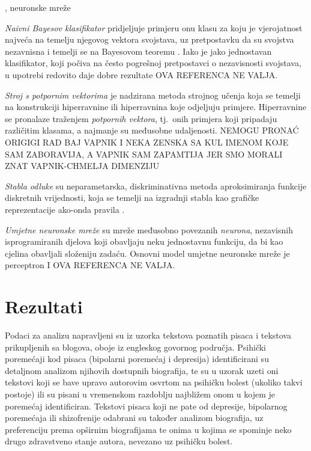 \documentclass[10pt, a4paper]{article}
\begin{document}
, neuronske mreže


\emph{Naivni Bayesov klasifikator} pridjeljuje primjeru onu klasu za koju je vjerojatnost najveća na temelju njegovog vektora svojstava, uz pretpostavku da su svojstva nezavnisna i temelji se na Bayesovom teoremu \citep{bayes-63}. Iako je jako jednostavan klasifikator, koji počiva na često pogrešnoj pretpostavci o nezavisnosti svojstava, u upotrebi redovito daje dobre rezultate \citep{hand-yu}OVA REFERENCA NE VALJA.

\emph{Stroj s potpornim vektorima}  je nadzirana metoda strojnog učenja koja se temelji na konstrukciji hiperravnine ili hiperravnina koje odjeljuju primjere. Hiperravnine se pronalaze traženjem \emph{potpornih vektora}, tj.~onih primjera koji pripadaju različitim klasama, a najmanje su međusobne udaljenosti. NEMOGU PRONAĆ ORIGIGI RAD BAJ VAPNIK I NEKA ZENSKA SA KUL IMENOM KOJE SAM ZABORAVIJA, A VAPNIK SAM ZAPAMTIJA JER SMO MORALI ZNAT VAPNIK-CHMELJA DIMENZIJU

\emph{Stabla odluke} su neparametarska, diskriminativna metoda aproksimiranja funkcije diskretnih vrijednosti, koja se temelji na izgradnji stabla kao grafičke reprezentacije ako-onda pravila \cite{mojaBaba}.

\emph{Umjetne neuronske mreže}  su mreže međusobno povezanih \emph{neurona}, nezavisnih isprogramiranih djelova koji obavljaju neku jednostavnu funkciju, da bi kao cjelina obavljali složeniju zadaću. Osnovni model umjetne neuronske mreže je perceptron \cite{rosenblatt-58}I OVA REFERENCA NE VALJA.


\section{Rezultati}

Podaci za analizu napravljeni su iz uzorka tekstova poznatih pisaca i tekstova prikupljenih sa blogova, oboje iz engleskog govornog područja. Psihički poremećaji kod pisaca (bipolarni poremećaj i depresija) identificirani su detaljnom analizom njihovih dostupnih biografija, te su u uzorak uzeti oni tekstovi koji se bave upravo autorovim osvrtom na psihičku bolest (ukoliko takvi postoje) ili su pisani u vremenskom razdoblju najbližem onom u kojem je poremećaj identificiran. Tekstovi pisaca koji ne pate od depresije, bipolarnog poremećaja ili shizofrenije odabrani su također analizom biografija, uz preferenciju prema opširnim biografijama te onima u kojima se spominje neko drugo zdravstveno stanje autora, nevezano uz psihičku bolest.
\end{document}
